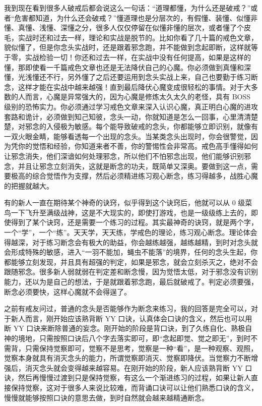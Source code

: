 我到现在看到很多人破戒后都会说这么一句话：“道理都懂，为什么还是破戒？”或者“危害都知道，为什么还会破戒？”懂道理也是分层次的，有假懂、装懂、似懂非懂、真懂、浅懂、深懂之分，很多人仅仅停留在似懂非懂的层次，或者懂了个皮毛，实战时还和过去一样，理论和实战是脱节的。比如你看了几十篇的戒色文章，貌似懂了，但是你念头实战时，还是跟着邪念跑，并不能做到念起即断，这样就等于零，实战检验一切！你还和过去一样，在实战中没有任何提高，如果是这样的懂，那即使看一千篇戒色文章也还是无法降伏自己的心魔。你必须做到真懂和深懂，光浅懂还不行，另外懂了之后还要运用到念头实战上来，自己也要勤于练习断念，这样才能在实战中越来越强！直到最后降伏心魔变成很轻松的事情。对于大多数的人而言，心魔是异常强大的，因为心魔是修炼太久太久的老怪，具有 BOSS 级别的恐怖实力。你必须通过学习戒色文章来深入认识心魔，真正明白心魔的进攻套路和诡计，必须做到知己知彼，念头一动，你就知道是怎么一回事，心里清清楚楚，对邪念的入侵极为敏感。每个能导致破戒的念头，你都能够立即识别，就像有一双火眼金睛，能够看透每一个出现的念头。当某类念头出现时，你会很警觉，因为凭你的觉悟和经验，你知道来者不善，你的警惕性会非常高。戒色高手懂得如何让邪念消失，他们深谙如何处理邪念，所以他们不怕邪念出现，他们能够识别邪念，并且让邪念立刻消失，这就是断念的功夫，既简单又深奥。要做到这一点，需要极高的综合觉悟作为支撑，然后必须精进练习观心断念，练习得越多，战胜心魔的把握就越大。

有的新人一直在期待某个神奇的诀窍，似乎得到这个诀窍后，他就可以从 0 级菜鸟一下飞升至满级战神，这是不大现实的，即使打游戏，也是一级级练上去的，即使得到了某个诀窍，还是需要一个练习的过程。其实最神奇的诀窍，就是两个字，一个“学”，一个“练”。天天学，天天练，学戒色的理论，练习观心断念。理论体会得越深，对于练习断念会有极大的助益，你会越练越强，越练越精，到时对念头就会形成特殊的敏感，进入“一羽不能加，蝇虫不能落”的境界，任何的念头生起，你都能够立刻发现，并且具有超强的判定，如果是邪念，就会立刻杀灭之，绝对不会跟随邪念。很多新人弱就弱在判定差和断念慢，因为觉悟太低，对于邪念没有识别能力，还以为是自己的想法，于是就跟着邪念跑，最后就破戒了。判定必须要强，断念必须要快，这样心魔就不会得逞了。

之前有戒友问过，普通的念头是否能够作为断念来练习，我的回答是完全可以，对于新人而言，刚开始应该熟背断 YY 口诀，认真体会口诀的含义，然后也可以用断 YY 口诀来断除普通的妄念。刚开始的阶段是背口诀，到了久练自化、熟极自神的境地，只需按照口诀后八个字去落实即可，即“念起即觉、觉之即无”，到时不需背，只需保持觉察即可，觉察不是思考，觉察是一种“看”，是一种观察、观照，觉察本身就具有消灭念头的能力，所谓觉察即消灭、觉察即降伏。当觉察力不断增强后，消灭念头就会变得越来越容易。在刚开始的阶段，新人应该熟背断 YY 口诀，然后再慢慢过渡到只是保持觉察，有这么一个渐进练习的过程，如果让新人直接保持觉察，这对于很多人来说比较难，而背诵口诀可以让他们熟悉口诀的含义，慢慢就能够按照口诀的意思去做，到时自然就会越来越精通断念。

